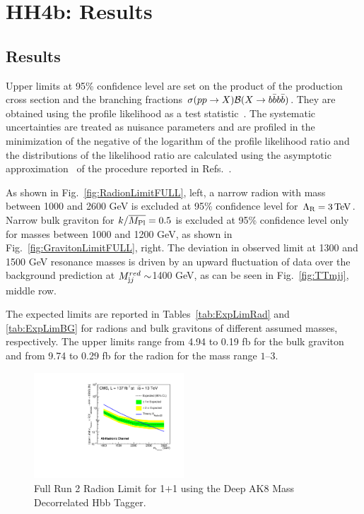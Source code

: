 \chapter{HH4b: Results}
\label{chap:seven}

\section{Results\label{sec:Results}}

Upper limits at 95\% confidence level are set
on the product of the production cross section and the branching
fractions $\sigma(pp\to X) \mathcal{B}(X\to b \bar{b}b \bar{b})$.
They are obtained using the profile likelihood as a test
statistic~\cite{ATLASCMSComb}. The systematic uncertainties are
treated as nuisance parameters and are profiled in the minimization of
the negative of the logarithm of the profile likelihood ratio and the
distributions of the likelihood ratio are calculated using the
asymptotic approximation~\cite{AsympCLs} of the procedure reported in
Refs.~\cite{CLS1,CLS2}.

As shown in Fig.~\ref{fig:RadionLimitFULL}, left, a narrow radion with
mass between 1000 and 2600 GeV is excluded at 95\% confidence level
for $\Lambda_{\textrm R}=3\,\text{Te\hspace{-.08em}V}$.  Narrow bulk graviton for $k/\overline{{M_\mathrm{Pl}}} =
0.5$ is excluded at 95\% confidence level only for masses between 1000
and 1200 GeV, as shown in Fig.~\ref{fig:GravitonLimitFULL}, right.
The deviation in observed limit at 1300 and 1500  GeV resonance masses
is driven by an upward fluctuation of data over the background prediction at
$M_{\textrm jj}^{red} \sim$1400 GeV, as can be seen in Fig.~\ref{fig:TTmjj}, middle
row.

The expected limits are reported in Tables~\ref{tab:ExpLimRad} and
\ref{tab:ExpLimBG} for radions and bulk gravitons of different assumed
masses, respectively. The upper limits range from 4.94 to 0.19 fb for the bulk
graviton and from 9.74 to 0.29 fb for the radion for the mass
range $1$--$3$\TeV.

\begin{figure}[!htb]
	\centering
	\includegraphics[width=0.5\textwidth]{Figures/limits_combine_137fb_dak8MDHbb_signalsAll_RadNar_MERGED.pdf}
	\caption{Full Run 2 Radion Limit for 1$+$1 using the Deep AK8 Mass Decorrelated Hbb Tagger.}
	\label{fig:RadionLimitMerged}
\end{figure}

